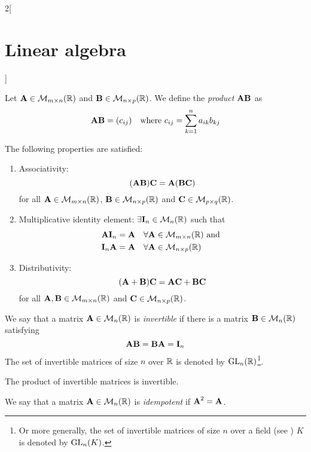 \documentclass[../../../main_math.tex]{subfiles}
\begin{document}
\begin{multicols}{2}[\section{Linear algebra}]
\begin{proposition}
\begin{enumerate}
    \end{enumerate}
  \end{proposition}
  \begin{definition}
    Let $\boldsymbol{\mathrm{A}}\in\mathcal{M}_{m\times n}(\mathbb{R})$ and $\boldsymbol{\mathrm{B}}\in\mathcal{M}_{n\times p}(\mathbb{R})$. We define the \emph{product} $\boldsymbol{\mathrm{A}}\boldsymbol{\mathrm{B}}$ as $$\boldsymbol{\mathrm{A}}\boldsymbol{\mathrm{B}}=(c_{ij})\quad\text{where }c_{ij}=\sum_{k=1}^na_{ik}b_{kj}$$
  \end{definition}
  \begin{proposition}
    The following properties are satisfied:
    \begin{enumerate}
      \item Associativity: $$(\boldsymbol{\mathrm{A}}\boldsymbol{\mathrm{B}})\boldsymbol{\mathrm{C}}=\boldsymbol{\mathrm{A}}(\boldsymbol{\mathrm{B}}\boldsymbol{\mathrm{C}})$$ for all $\boldsymbol{\mathrm{A}}\in\mathcal{M}_{m\times n}(\mathbb{R})$, $\boldsymbol{\mathrm{B}}\in\mathcal{M}_{n\times p}(\mathbb{R})$ and $\boldsymbol{\mathrm{C}}\in\mathcal{M}_{p\times q}(\mathbb{R})$.
      \item Multiplicative identity element: $\exists\boldsymbol{\mathrm{I}}_n\in\mathcal{M}_n(\mathbb{R})$ such that
            \begin{align*}
               & \boldsymbol{\mathrm{A}}\boldsymbol{\mathrm{I}}_n=\boldsymbol{\mathrm{A}}\quad\forall\boldsymbol{\mathrm{A}}\in\mathcal{M}_{m\times n}(\mathbb{R})\text{ and } \\
               & \boldsymbol{\mathrm{I}}_n\boldsymbol{\mathrm{A}}=\boldsymbol{\mathrm{A}}\quad\forall\boldsymbol{\mathrm{A}}\in\mathcal{M}_{n\times p}(\mathbb{R})
            \end{align*}
      \item Distributivity: $$(\boldsymbol{\mathrm{A}}+\boldsymbol{\mathrm{B}})\boldsymbol{\mathrm{C}}=\boldsymbol{\mathrm{A}}\boldsymbol{\mathrm{C}}+\boldsymbol{\mathrm{B}}\boldsymbol{\mathrm{C}}$$ for all $\boldsymbol{\mathrm{A}},\boldsymbol{\mathrm{B}}\in\mathcal{M}_{m\times n}(\mathbb{R})$ and $\boldsymbol{\mathrm{C}}\in\mathcal{M}_{n\times p}(\mathbb{R})$.
    \end{enumerate}
  \end{proposition}
  \begin{definition}
    We say that a matrix $\boldsymbol{\mathrm{A}}\in\mathcal{M}_n(\mathbb{R})$ is \emph{invertible} if there is a matrix $\boldsymbol{\mathrm{B}}\in\mathcal{M}_n(\mathbb{R})$ satisfying $$\boldsymbol{\mathrm{A}}\boldsymbol{\mathrm{B}}=\boldsymbol{\mathrm{B}}\boldsymbol{\mathrm{A}}=\boldsymbol{\mathrm{I}}_n$$
    The set of invertible matrices of size $n$ over $\mathbb{R}$ is denoted by $\mathrm{GL}_n(\mathbb{R})$\footnote{Or more generally, the set of invertible matrices of size $n$ over a field (see ) $K$ is denoted by $\mathrm{GL}_n(K)$.}.
  \end{definition}
  \begin{lemma}
    The product of invertible matrices is invertible.
  \end{lemma}
  \begin{definition}
    We say that a matrix $\boldsymbol{\mathrm{A}}\in\mathcal{M}_n(\mathbb{R})$ is \emph{idempotent} if $\boldsymbol{\mathrm{A}}^2=\boldsymbol{\mathrm{A}}$.
  \end{definition}

\end{multicols}
\end{document}

